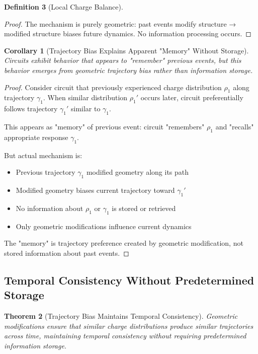 \documentclass[12pt,a4paper]{article}
\theoremstyle{plain}
\newtheorem{theorem}{Theorem}[section]
\newtheorem{corollary}[theorem]{Corollary}
\theoremstyle{definition}
\newtheorem{definition}[theorem]{Definition}
\theoremstyle{remark}
\begin{document}
\begin{definition}[Local Charge Balance]
\begin{proof}
The mechanism is purely geometric: past events modify structure → modified structure biases future dynamics. No information processing occurs.
\end{proof}

\begin{corollary}[Trajectory Bias Explains Apparent "Memory" Without Storage]
\label{cor:apparent_memory}
Circuits exhibit behavior that appears to "remember" previous events, but this behavior emerges from geometric trajectory bias rather than information storage.
\end{corollary}

\begin{proof}
Consider circuit that previously experienced charge distribution $\rho_1$ along trajectory $\gamma_1$. When similar distribution $\rho_1'$ occurs later, circuit preferentially follows trajectory $\gamma_1'$ similar to $\gamma_1$.

This appears as "memory" of previous event: circuit "remembers" $\rho_1$ and "recalls" appropriate response $\gamma_1$.

But actual mechanism is:
\begin{itemize}
\item Previous trajectory $\gamma_1$ modified geometry along its path
\item Modified geometry biases current trajectory toward $\gamma_1'$
\item No information about $\rho_1$ or $\gamma_1$ is stored or retrieved
\item Only geometric modifications influence current dynamics
\end{itemize}

The "memory" is trajectory preference created by geometric modification, not stored information about past events.
\end{proof}

\subsection{Temporal Consistency Without Predetermined Storage}

\begin{theorem}[Trajectory Bias Maintains Temporal Consistency]
\label{thm:temporal_consistency_bias}
Geometric modifications ensure that similar charge distributions produce similar trajectories across time, maintaining temporal consistency without requiring predetermined information storage.
\end{theorem}


\end{definition}
\end{document}
